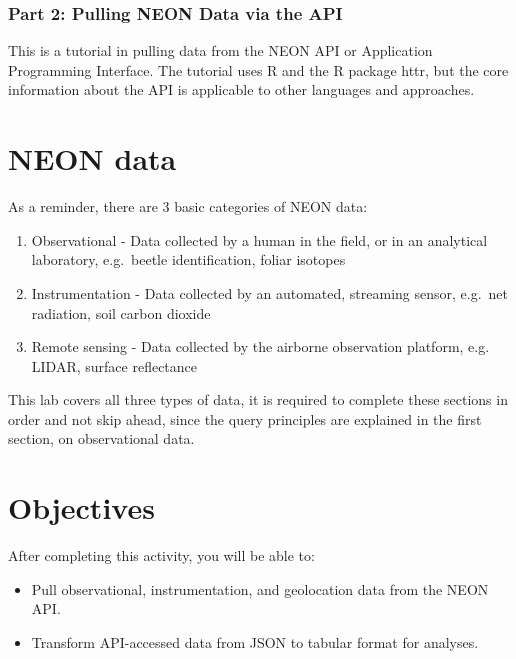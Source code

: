 \documentclass[]{book}
\providecommand{\tightlist}{%
  \setlength{\itemsep}{0pt}\setlength{\parskip}{0pt}}
\begin{document}
\hypertarget{part-2-pulling-neon-data-via-the-api}{%
\subsubsection{Part 2: Pulling NEON Data via the API}\label{part-2-pulling-neon-data-via-the-api}}

This is a tutorial in pulling data from the NEON API or Application
Programming Interface. The tutorial uses R and the R package httr, but the core
information about the API is applicable to other languages and approaches.

\hypertarget{neon-data-1}{%
\section{NEON data}\label{neon-data-1}}

As a reminder, there are 3 basic categories of NEON data:

\begin{enumerate}
\def\labelenumi{\arabic{enumi}.}
\tightlist
\item
  Observational - Data collected by a human in the field, or in an analytical
  laboratory, e.g.~beetle identification, foliar isotopes
\item
  Instrumentation - Data collected by an automated, streaming sensor, e.g.~net
  radiation, soil carbon dioxide
\item
  Remote sensing - Data collected by the airborne observation platform, e.g.
  LIDAR, surface reflectance
\end{enumerate}

This lab covers all three types of data, it is required to complete these sections in order and not skip ahead, since the query principles
are explained in the first section, on observational data.

\hypertarget{ds-objectives}{}
\hypertarget{objectives-1}{%
\section{Objectives}\label{objectives-1}}

After completing this activity, you will be able to:

\begin{itemize}
\tightlist
\item
  Pull observational, instrumentation, and geolocation data from the NEON API.
\item
  Transform API-accessed data from JSON to tabular format for analyses.
\end{itemize}
\end{document}
